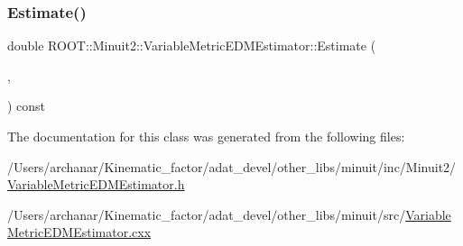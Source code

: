 \subsubsection{\texorpdfstring{Estimate()}{Estimate()}\hspace{0.1cm}{\footnotesize\ttfamily [2/2]}}
{\footnotesize\ttfamily double R\+O\+O\+T\+::\+Minuit2\+::\+Variable\+Metric\+E\+D\+M\+Estimator\+::\+Estimate (\begin{DoxyParamCaption}\item[{const \mbox{\hyperlink{classROOT_1_1Minuit2_1_1FunctionGradient}{Function\+Gradient}} \&}]{,  }\item[{const \mbox{\hyperlink{classROOT_1_1Minuit2_1_1MinimumError}{Minimum\+Error}} \&}]{ }\end{DoxyParamCaption}) const}



The documentation for this class was generated from the following files\+:\begin{DoxyCompactItemize}
\item 
/\+Users/archanar/\+Kinematic\+\_\+factor/adat\+\_\+devel/other\+\_\+libs/minuit/inc/\+Minuit2/\mbox{\hyperlink{other__libs_2minuit_2inc_2Minuit2_2VariableMetricEDMEstimator_8h}{Variable\+Metric\+E\+D\+M\+Estimator.\+h}}\item 
/\+Users/archanar/\+Kinematic\+\_\+factor/adat\+\_\+devel/other\+\_\+libs/minuit/src/\mbox{\hyperlink{VariableMetricEDMEstimator_8cxx}{Variable\+Metric\+E\+D\+M\+Estimator.\+cxx}}\end{DoxyCompactItemize}
